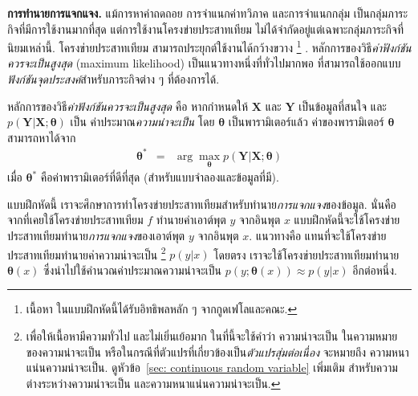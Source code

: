 \begin{Exercise}
	\label{ex: ann predicts dists}
	
\textbf{การทำนายการแจกแจง.}
แม้การหาค่าถดถอย การจำแนกค่าทวิภาค และการจำแนกกลุ่ม เป็นกลุ่มภาระกิจที่มีการใช้งานมากที่สุด
แต่การใช้งานโครงข่ายประสาทเทียม ไม่ได้จำกัดอยู่แต่เฉพาะกลุ่มภาระกิจที่นิยมเหล่านี้.
โครงข่ายประสาทเทียม สามารถประยุกต์ใช้งานได้กว้างขวาง%
\footnote{%
เนื้อหา ในแบบฝึกหัดนี้ได้รับอิทธิพลหลัก ๆ จากกูดเฟโลและคณะ\cite[.2.4]{GoodfellowEtAl2016}.
}%
. หลักการของวิธี\textit{ค่าฟังก์ชันควรจะเป็นสูงสุด} (maximum likelihood)
เป็นแนวทางหนึ่งที่ทั่วไปมากพอ ที่สามารถใช้ออกแบบ\textit{ฟังก์ชันจุดประสงค์}สำหรับภาระกิจต่าง ๆ ที่ต้องการได้.

หลักการของวิธี\textit{ค่าฟังก์ชันควรจะเป็นสูงสุด} คือ
หากกำหนดให้ $\bm{X}$ และ $\bm{Y}$ เป็นข้อมูลที่สนใจ
และ
$p(\bm{Y}|\bm{X}; \bm{\theta})$
เป็น
ค่าประมาณ\textit{ความน่าจะเป็น} 
โดย $\bm{\theta}$ เป็นพารามิเตอร์แล้ว
ค่าของพารามิเตอร์ $\bm{\theta}$ สามารถหาได้จาก
\begin{eqnarray}
\bm{\theta}^\ast &=& \arg\max_{\bm{\theta}} p(\bm{Y}|\bm{X}; \bm{\theta})
\label{eq: maximum likelihood}
\end{eqnarray}
เมื่อ $\bm{\theta}^\ast$ คือค่าพารามิเตอร์ที่ดีที่สุด (สำหรับแบบจำลองและข้อมูลที่มี).

แบบฝึกหัดนี้
เราจะศึกษาการทำโครงข่ายประสาทเทียมสำหรับทำนาย\textit{การแจกแจง}ของข้อมูล.
นั่นคือ จากที่เคยใช้โครงข่ายประสาทเทียม $f$ ทำนายค่าเอาต์พุต $y$ จากอินพุต $x$
แบบฝึกหัดนี้จะใช้โครงข่ายประสาทเทียมทำนาย\textit{การแจกแจง}ของเอาต์พุต $y$ จากอินพุต $x$.
แนวทางคือ แทนที่จะใช้โครงข่ายประสาทเทียมทำนายค่าความน่าจะเป็น%
\footnote{%
เพื่อให้เนื้อหามีความทั่วไป และไม่เยิ่นเย้อมาก
ในที่นี้จะใช้คำว่า ความน่าจะเป็น ในความหมายของความน่าจะเป็น หรือในกรณีที่ตัวแปรที่เกี่ยวข้องเป็น\textit{ตัวแปรสุ่มต่อเนื่อง}
จะหมายถึง ความหนาแน่นความน่าจะเป็น.
ดูหัวข้อ~\ref{sec: continuous random variable} เพิ่มเติม สำหรับความต่างระหว่างความน่าจะเป็น
และความหนาแน่นความน่าจะเป็น.
} 
$p(y|x)$ 
โดยตรง 
เราจะใช้โครงข่ายประสาทเทียมทำนาย $\bm{\theta}(x)$ ซึ่งนำไปใช้คำนวณค่าประมาณความน่าจะเป็น $p(y; \bm{\theta}(x)) \approx p(y|x)$ อีกต่อหนึ่ง.


\end{Exercise}

